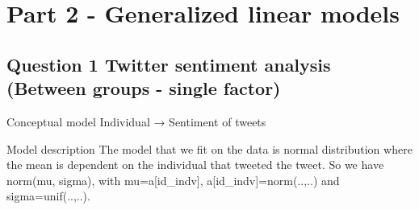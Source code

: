 \documentclass[
  ignorenonframetext,
]{beamer}
\begin{document}
\hypertarget{part-2---generalized-linear-models}{%
\section{Part 2 - Generalized linear
models}\label{part-2---generalized-linear-models}}

\hypertarget{question-1-twitter-sentiment-analysis-between-groups---single-factor}{%
\subsection{Question 1 Twitter sentiment analysis (Between groups -
single
factor)}\label{question-1-twitter-sentiment-analysis-between-groups---single-factor}}

\begin{frame}{Conceptual model}
\protect\hypertarget{conceptual-model}{}
Individual → Sentiment of tweets
\end{frame}

\begin{frame}{Model description}
\protect\hypertarget{model-description}{}
The model that we fit on the data is normal distribution where the mean
is dependent on the individual that tweeted the tweet. So we have
norm(mu, sigma), with mu=a{[}id\_indv{]}, a{[}id\_indv{]}=norm(..,..)
and sigma=unif(..,..).
\end{frame}
\end{document}
